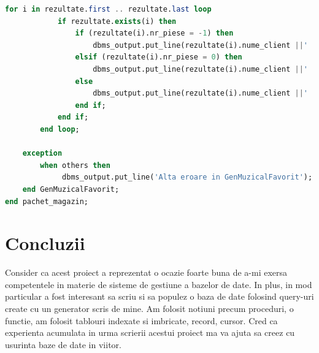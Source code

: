 \documentclass{article}
\begin{document}
\begin{lstlisting}[language=SQL, title=Cerinta 13]
        for i in rezultate.first .. rezultate.last loop
            if rezultate.exists(i) then
                if (rezultate(i).nr_piese = -1) then
                    dbms_output.put_line(rezultate(i).nume_client ||' '||  rezultate(i).prenume_client ||' nu are un gen preferat');
                elsif (rezultate(i).nr_piese = 0) then
                    dbms_output.put_line(rezultate(i).nume_client ||' '||  rezultate(i).prenume_client ||' nu a efectuat nicio comanda pana acum');
                else
                    dbms_output.put_line(rezultate(i).nume_client ||' '||  rezultate(i).prenume_client ||' are genul preferat ' || rezultate(i).nume_gen ||', cu '|| rezultate(i).nr_piese||' albume comandate de acest gen');
                end if;
            end if;
        end loop;
        
    exception
        when others then
             dbms_output.put_line('Alta eroare in GenMuzicalFavorit');
    end GenMuzicalFavorit;
end pachet_magazin;

 \end{lstlisting}




\newpage
\section{Concluzii}
Consider ca acest proiect a reprezentat o ocazie foarte buna de a-mi exersa competentele in materie de sisteme de gestiune a bazelor de date. In plus, in mod particular a fost interesant sa scriu si sa populez o baza de date folosind query-uri create cu un generator scris de mine. Am folosit notiuni precum proceduri, o functie, am folosit tablouri indexate si imbricate, record, cursor.
Cred ca experienta acumulata in urma scrierii acestui proiect ma va ajuta sa creez cu usurinta baze de date in viitor.

\stopcontents[mainsections]
\end{document}
